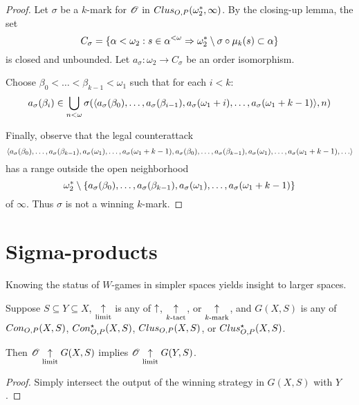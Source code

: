 \begin{proof}
  Let $\sigma$ be a $k$-mark for $\mathscr{O}$ in
  $Clus_{O,P}(\omega^*_2,\infty)$. By the closing-up lemma, the set
    \[
      C_\sigma
        =
      \{
        \alpha<\omega_2
          :
        s\in\alpha^{<\omega}
          \Rightarrow
        \omega^*_2\setminus\sigma\circ\mu_k(s)
        \subset \alpha
      \}
    \]
  is closed and unbounded. Let $a_\sigma:\omega_2\to C_\sigma$ be
  an order isomorphism.

  Choose $\beta_0<\dots<\beta_{k-1}<\omega_1$ such that for each $i<k$:
    \[
      a_\sigma(\beta_i)
        \in
      \bigcup_{n<\omega}
      \sigma(
        \langle a_\sigma(\beta_0),\dots,a_\sigma(\beta_{i-1}),
          a_\sigma(\omega_1+i),\dots,a_\sigma(\omega_1+k-1)\rangle,
      n)
    \]

  Finally, observe that the legal counterattack
    \[
      \<a_\sigma(\beta_0),\dots,a_\sigma(\beta_{k-1}),
        a_\sigma(\omega_1),\dots,a_\sigma(\omega_1+k-1),
        a_\sigma(\beta_0),\dots,a_\sigma(\beta_{k-1}),
        a_\sigma(\omega_1),\dots,a_\sigma(\omega_1+k-1),
        \dots\>
    \]
  has a range outside the open neighborhood
    \[
      \omega^*_2
        \setminus
      \{a_\sigma(\beta_0),\dots,a_\sigma(\beta_{k-1}),
        a_\sigma(\omega_1),\dots,a_\sigma(\omega_1+k-1)\}
    \]
  of $\infty$. Thus $\sigma$ is not a winning $k$-mark.
\end{proof}



\section{Sigma-products}

Knowing the status of $W$-games in simpler spaces yields insight to larger
spaces.

\begin{prop}
  Suppose $S\subseteq Y\subseteq X$, $\underset{\text{limit}}{\uparrow}$ is any of $\uparrow$,
  $\underset{k\text{-tact}}{\uparrow}$, or $\underset{k\text{-mark}}{\uparrow}$, and $G(X,S)$ is any of $Con_{O,P}(X,S)$,
  $Con_{O,P}^\star(X,S)$, $Clus_{O,P}(X,S)$, or $Clus_{O,P}^\star(X,S)$.

  Then $\mathscr{O} \underset{\text{limit}}{\uparrow} G(X,S)$ implies $\mathscr{O} \underset{\text{limit}}{\uparrow} G(Y,S)$.
\end{prop}

\begin{proof}
  Simply intersect the output of the winning strategy in $G(X,S)$ with $Y$.
\end{proof}

